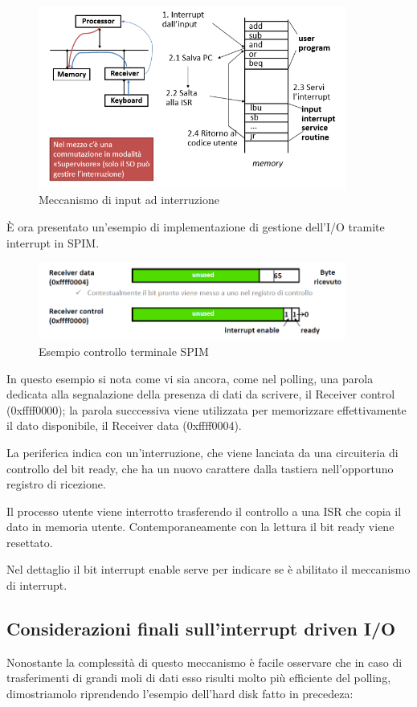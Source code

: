 \documentclass[class=book, crop=false, oneside]{standalone}
\begin{document}
\begin{figure}[H]
	\centering
	\includegraphics[width=0.9\textwidth,keepaspectratio]{input-a-interruzione}
	\caption{Meccanismo di input ad interruzione}
\end{figure}

È ora presentato un'esempio di implementazione di gestione dell'I/O tramite interrupt in SPIM.
\begin{figure}
	\centering
	\includegraphics[width=0.9\textwidth,keepaspectratio]{SPIM2}
	\caption{Esempio controllo terminale SPIM}
\end{figure}

In questo esempio si nota come vi sia ancora, come nel polling, una parola dedicata alla segnalazione della presenza di dati da scrivere, il Receiver control (0xffff0000); la parola succcessiva viene utilizzata per memorizzare effettivamente il dato disponibile, il Receiver data (0xffff0004).

La periferica indica con un’interruzione, che viene lanciata da una circuiteria di controllo del bit ready, che ha un nuovo carattere dalla tastiera nell’opportuno registro di ricezione.

Il processo utente viene interrotto trasferendo il controllo a una ISR che copia il dato in memoria utente. Contemporaneamente con la lettura il bit ready viene resettato.

Nel dettaglio il bit interrupt enable serve per indicare se è abilitato il meccanismo di interrupt.

\subsection{Considerazioni finali sull'interrupt driven I/O}
Nonostante la complessità di questo meccanismo è facile osservare che in caso di trasferimenti di grandi moli di dati esso risulti  molto più efficiente del polling, dimostriamolo riprendendo l'esempio dell'hard disk fatto in precedeza:
\end{document}
